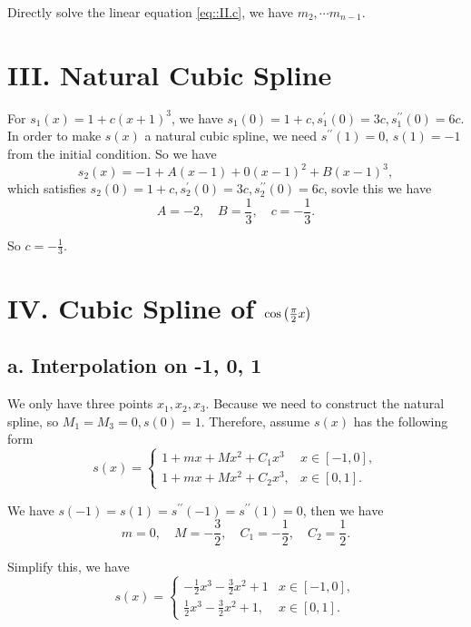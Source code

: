 \documentclass[a4paper]{article}
\begin{document}
Directly solve the linear equation \eqref{eq::II.c}, we have $ m_2, \cdots m_{n-1} $. 


\section*{III. Natural Cubic Spline}

For $s_1(x) = 1+c(x+1)^3$, we have $s_1(0) = 1+c, s_1 ^{\prime}(0) = 3c, s_1 ^{\prime \prime}(0) = 6c$. In order to make $s(x)$ a natural cubic spline, we need $s ^{\prime \prime}(1) = 0$, $s(1)=-1$ from the initial condition. So we have
\begin{equation}
    s_2(x) = -1 + A (x-1) + 0(x-1)^2 + B(x-1)^3,
\end{equation}
which satisfies $s_2(0) = 1+c, s_2^{\prime}(0) = 3c, s_2 ^{\prime \prime}(0) = 6c$, sovle this we have
\begin{equation}
        A = - 2, \quad
        B = \frac{1}{3}, \quad
        c = -\frac{1}{3}.
\end{equation}

So $c = -\frac{1}{3}$.

\section*{IV. Cubic Spline of $\cos\qty(\frac{\pi}{2}x)$}

\subsection*{a. Interpolation on -1, 0, 1}

We only have three points $x_1,x_2,x_3$. Because we need to construct the natural spline, so $M_1 = M_3 = 0, s(0) = 1$. Therefore, assume $s(x)$ has the following form
\begin{equation}
    s(x) = 
    \begin{cases}
        1 + mx + Mx^2 + C_1 x^3 & x \in [-1,0],\\
        1 + mx + Mx^2 + C_2 x^3, & x \in [0,1].
    \end{cases}
\end{equation}

We have $s(-1) = s(1) = s^{\prime \prime}(-1) = s^{\prime \prime}(1) = 0$, then we have
\begin{equation}
    m = 0, \quad M = -\frac{3}{2}, \quad C_1 = -\frac{1}{2}, \quad C_2 = \frac{1}{2}.
\end{equation}

Simplify this, we have
\begin{equation}
    s(x) = 
    \begin{cases}
        -\frac{1}{2} x^3 - \frac{3}{2} x^2 + 1 & x \in [-1,0],\\
        \frac{1}{2} x^3 - \frac{3}{2} x^2 + 1, & x \in [0,1]. 
    \end{cases}
    \label{eq::IV.s(x)}
\end{equation}
\end{document}
